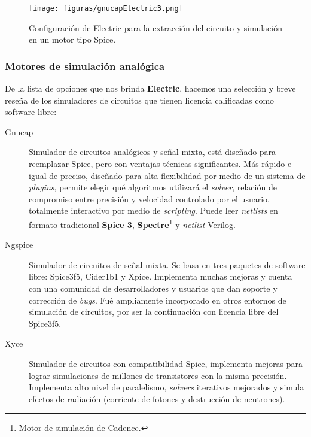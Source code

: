 \begin{figure}
  \centering
\texttt{[image: figuras/gnucapElectric3.png]}
  \caption{Configuración de Electric para la extracción del circuito y simulación en un motor tipo Spice.}
\label{fig:gnucapElectric}
\end{figure}



\subsubsection{Motores de simulación analógica}

De la lista de opciones que nos brinda \textbf{Electric}, hacemos una selección y breve reseña de los simuladores de circuitos que tienen licencia calificadas como software libre:


\begin{description}
\item[Gnucap] Simulador de circuitos analógicos y señal mixta, está diseñado para reemplazar Spice, pero con ventajas técnicas significantes. Más rápido e igual de preciso, diseñado para alta flexibilidad por medio de un sistema de \emph{plugins}, permite elegir qué algoritmos utilizará el \emph{solver}, relación de compromiso entre precisión y velocidad controlado por el usuario, totalmente interactivo por medio de \emph{scripting}. Puede leer \emph{netlists} en formato tradicional \textbf{Spice 3}, \textbf{Spectre}\footnote{Motor de simulación de Cadence.} y  \emph{netlist} Verilog.

\item[Ngspice] Simulador de circuitos de señal mixta. Se basa en tres paquetes de software libre: Spice3f5, Cider1b1 y Xpice. Implementa muchas mejoras y cuenta con una comunidad de desarrolladores y usuarios que dan soporte y corrección de \emph{bugs}. Fué ampliamente incorporado en otros entornos de simulación de circuitos, por ser la continuación con licencia libre del Spice3f5.

\item[Xyce] Simulador de circuitos con compatibilidad Spice, implementa mejoras para lograr simulaciones de millones de transistores con la misma precisión. Implementa alto nivel de paralelismo, \emph{solvers} iterativos mejorados y simula efectos de radiación (corriente de fotones y destrucción de neutrones).
\end{description}


